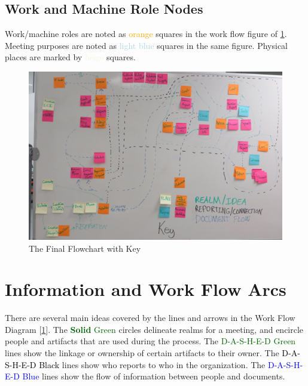 \documentclass[12pt]{article} %
\begin{document}
\begin{samepage}
\section{Work and Machine Role Nodes} %
  Work/machine roles are noted as \textcolor{orange}{orange} squares in the work flow figure of \ref{fig:Workflow_final}.
  Meeting purposes are noted as \textcolor{lightblue}{light blue} squares in the same figure.
  Physical places are marked by \textcolor{beige}{beige} squares.
    \begin{figure}[H]
      \centering
      \includegraphics[width=\linewidth]{flow/flowchart_final}
      \caption{The Final Flowchart with Key}
      \label{fig:Workflow_final}
    \end{figure}
  \end{samepage}

\section{Information and Work Flow Arcs} %
  There are several main ideas covered by the lines and arrows in the Work Flow Diagram [\ref{fig:Workflow_final}].
  The \textcolor{darkgreen}{\textbf{Solid} Green} circles delineate realms for a meeting, and encircle people and artifacts that are used during the process.
  The \textcolor{darkgreen}{D-A-S-H-E-D Green} lines show the linkage or ownership of certain artifacts to their owner.
  The \textcolor{black}{D-A-S-H-E-D Black} lines show who reports to who in the organization.
  The \textcolor{blue}{D-A-S-H-E-D Blue} lines show the flow of information between people and documents.
\end{document}
